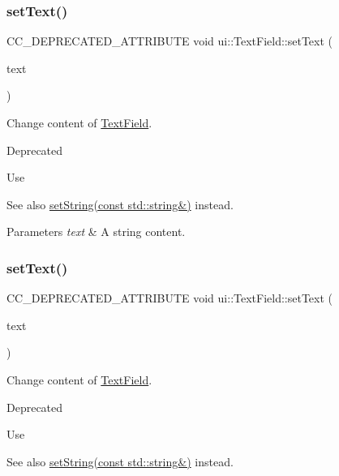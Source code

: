 \subsubsection{\texorpdfstring{set\+Text()}{setText()}\hspace{0.1cm}{\footnotesize\ttfamily [1/2]}}
{\footnotesize\ttfamily C\+C\+\_\+\+D\+E\+P\+R\+E\+C\+A\+T\+E\+D\+\_\+\+A\+T\+T\+R\+I\+B\+U\+TE void ui\+::\+Text\+Field\+::set\+Text (\begin{DoxyParamCaption}\item[{const std\+::string \&}]{text }\end{DoxyParamCaption})\hspace{0.3cm}{\ttfamily [inline]}}

Change content of \hyperlink{classui_1_1TextField}{Text\+Field}. \begin{DoxyRefDesc}{Deprecated}
\item[\hyperlink{deprecated__deprecated000163}{Deprecated}]Use\end{DoxyRefDesc}
\begin{DoxySeeAlso}{See also}
{\ttfamily \hyperlink{classui_1_1TextField_a7bd0a4832cf52651f5fccfb15d3c97c4}{set\+String(const std\+::string\&)}} instead. 
\end{DoxySeeAlso}

\begin{DoxyParams}{Parameters}
{\em text} & A string content. \\
\hline
\end{DoxyParams}
\mbox{\label{classui_1_1TextField_adcd37c99947c549a77ffbd3389e176b3}} 
\subsubsection{\texorpdfstring{set\+Text()}{setText()}\hspace{0.1cm}{\footnotesize\ttfamily [2/2]}}
{\footnotesize\ttfamily C\+C\+\_\+\+D\+E\+P\+R\+E\+C\+A\+T\+E\+D\+\_\+\+A\+T\+T\+R\+I\+B\+U\+TE void ui\+::\+Text\+Field\+::set\+Text (\begin{DoxyParamCaption}\item[{const std\+::string \&}]{text }\end{DoxyParamCaption})\hspace{0.3cm}{\ttfamily [inline]}}

Change content of \hyperlink{classui_1_1TextField}{Text\+Field}. \begin{DoxyRefDesc}{Deprecated}
\item[\hyperlink{deprecated__deprecated000398}{Deprecated}]Use\end{DoxyRefDesc}
\begin{DoxySeeAlso}{See also}
{\ttfamily \hyperlink{classui_1_1TextField_a7bd0a4832cf52651f5fccfb15d3c97c4}{set\+String(const std\+::string\&)}} instead. 
\end{DoxySeeAlso}

